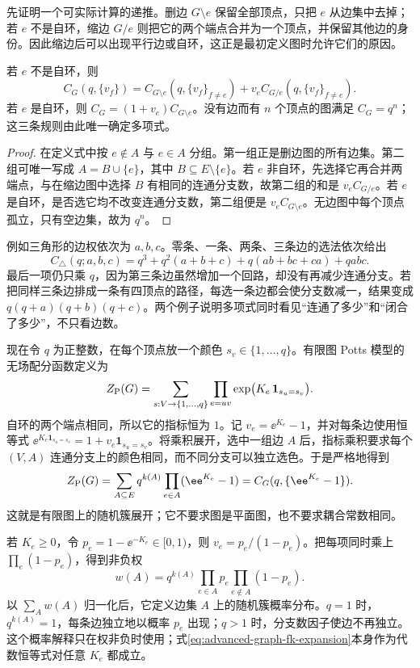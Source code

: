 先证明一个可实际计算的递推。删边 $G\setminus e$ 保留全部顶点，只把 $e$ 从边集中去掉；若 $e$ 不是自环，缩边 $G/e$ 则把它的两个端点合并为一个顶点，并保留其他边的身份。因此缩边后可以出现平行边或自环，这正是最初定义图时允许它们的原因。

\begin{proposition}[删边--缩边恒等式]
若 $e$ 不是自环，则
\[
C_G(q,\{v_f\})=C_{G\setminus e}(q,\{v_f\}_{f\ne e})
+v_e C_{G/e}(q,\{v_f\}_{f\ne e}).
\]
若 $e$ 是自环，则 $C_G=(1+v_e)C_{G\setminus e}$。没有边而有 $n$ 个顶点的图满足 $C_G=q^n$；这三条规则由此唯一确定多项式。
\end{proposition}

\begin{proof}
在定义式中按 $e\notin A$ 与 $e\in A$ 分组。第一组正是删边图的所有边集。第二组可唯一写成 $A=B\cup\{e\}$，其中 $B\subseteq E\setminus\{e\}$。若 $e$ 非自环，先选择它再合并两端点，与在缩边图中选择 $B$ 有相同的连通分支数，故第二组的和是 $v_eC_{G/e}$。若 $e$ 是自环，是否选它均不改变连通分支数，第二组便是 $v_eC_{G\setminus e}$。无边图中每个顶点孤立，只有空边集，故为 $q^n$。
\end{proof}

例如三角形的边权依次为 $a,b,c$。零条、一条、两条、三条边的选法依次给出
\[
C_\triangle(q;a,b,c)
=q^3+q^2(a+b+c)+q(ab+bc+ca)+qabc.
\]
最后一项仍只乘 $q$，因为第三条边虽然增加一个回路，却没有再减少连通分支。若把同样三条边排成一条有四顶点的路径，每选一条边都会使分支数减一，结果变成 $q(q+a)(q+b)(q+c)$。两个例子说明多项式同时看见“连通了多少”和“闭合了多少”，不只看边数。

现在令 $q$ 为正整数，在每个顶点放一个颜色 $s_v\in\{1,\ldots,q\}$。有限图 Potts 模型的无场配分函数定义为
\[
Z_{\rm P}(G)=\sum_{s:V\to\{1,\ldots,q\}}
\prod_{e=uv}\exp\bigl(K_e\,\mathbf1_{s_u=s_v}\bigr).
\]
自环的两个端点相同，所以它的指标恒为 $1$。记 $v_e=\ee^{K_e}-1$，并对每条边使用恒等式
$\ee^{K_e\mathbf1_{s_u=s_v}}=1+v_e\mathbf1_{s_u=s_v}$。将乘积展开，选中一组边 $A$ 后，指标乘积要求每个 $(V,A)$ 连通分支上的颜色相同，而不同分支可以独立选色。于是严格地得到
\begin{equation}
 Z_{\rm P}(G)=\sum_{A\subseteq E}q^{k(A)}\prod_{e\in A}(\ee^{K_e}-1)
 =C_G(q,\{\ee^{K_e}-1\}).
 \label{eq:advanced-graph-fk-expansion}
\end{equation}
这就是有限图上的随机簇展开；它不要求图是平面图，也不要求耦合常数相同。

若 $K_e\ge0$，令 $p_e=1-\ee^{-K_e}\in[0,1)$，则 $v_e=p_e/(1-p_e)$。把每项同时乘上 $\prod_e(1-p_e)$，得到非负权
\[
w(A)=q^{k(A)}\prod_{e\in A}p_e\prod_{e\notin A}(1-p_e).
\]
以 $\sum_Aw(A)$ 归一化后，它定义边集 $A$ 上的随机簇概率分布。$q=1$ 时，$q^{k(A)}=1$，每条边独立地以概率 $p_e$ 出现；$q>1$ 时，分支数因子使边不再独立。这个概率解释只在权非负时使用；式\cref{eq:advanced-graph-fk-expansion}本身作为代数恒等式对任意 $K_e$ 都成立。

